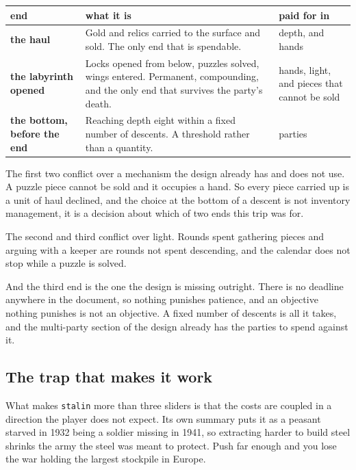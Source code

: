 \documentclass[11pt,a4paper]{article}
\begin{document}
\begin{center}
\begin{tabular}{@{}>{\raggedright\arraybackslash}p{}@{\hspace{4mm}}>{\raggedright\arraybackslash}p{}@{\hspace{4mm}}>{\raggedright\arraybackslash}p{}@{}}
\toprule
\textbf{end} & \textbf{what it is} & \textbf{paid for in} \\
\midrule
\textbf{the haul} & Gold and relics carried to the surface and sold. The only end that is
spendable. &
depth, and hands \\[1mm]
\textbf{the labyrinth opened} & Locks opened from below, puzzles solved, wings entered. Permanent,
compounding, and the only end that survives the party's death. &
hands, light, and pieces that cannot be sold \\[1mm]
\textbf{the bottom, before the end} & Reaching depth eight within a fixed number of descents.
A threshold rather than a quantity. &
parties \\
\bottomrule
\end{tabular}
\end{center}

The first two conflict over a mechanism the design already has and does not use. A puzzle piece
cannot be sold and it occupies a hand. So every piece carried up is a unit of haul declined, and
the choice at the bottom of a descent is not inventory management, it is a decision about which
of two ends this trip was for.

The second and third conflict over light. Rounds spent gathering pieces and arguing with a keeper
are rounds not spent descending, and the calendar does not stop while a puzzle is solved.

\begin{sectionbox}
And the third end is the one the design is missing outright. There is no deadline anywhere in the
document, so nothing punishes patience, and an objective nothing punishes is not an objective. A
fixed number of descents is all it takes, and the multi-party section of the design already has
the parties to spend against it.
\end{sectionbox}

\subsection{The trap that makes it work}

What makes \texttt{stalin} more than three sliders is that the costs are coupled in a direction
the player does not expect. Its own summary puts it as a peasant starved in 1932 being a soldier
missing in 1941, so extracting harder to build steel shrinks the army the steel was meant to
protect. Push far enough and you lose the war holding the largest stockpile in Europe.
\end{document}
